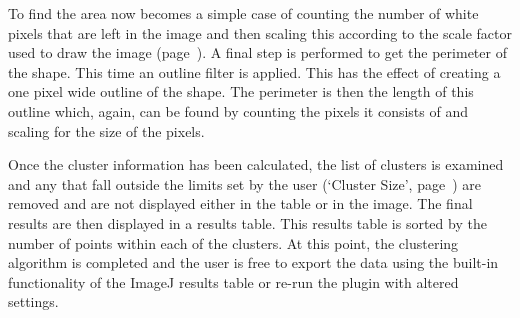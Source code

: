 To find the area now becomes a simple case of counting the number of white
pixels that are left in the image and then scaling this according to the scale
factor used to draw the image (page~\pageref{it:scale}). A final step is
performed to get the perimeter of the shape. This time an outline filter is
applied. This has the effect of creating a one pixel wide outline of the shape.
The perimeter is then the length of this outline which, again, can be found by
counting the pixels it consists of and scaling for the size of the pixels.

Once the cluster information has been calculated, the list of clusters is
examined and any that fall outside the limits set by the user (`Cluster Size',
page~\pageref{it:cluster-size}) are removed and are not displayed either in the
table or in the image. The final results are then  displayed in a results
table. This results table is sorted by the number of points within each of the
clusters. At this point, the clustering algorithm is completed and the user is
free to export the data using the built-in functionality of the ImageJ results
table or re-run the plugin with altered settings.
